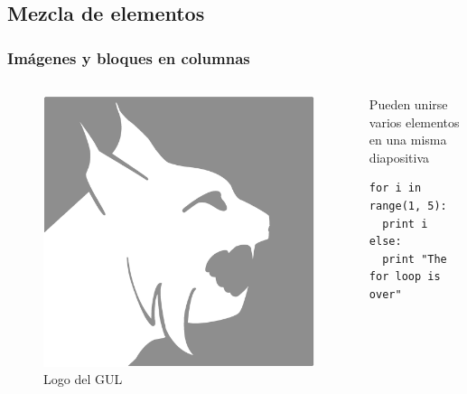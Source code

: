 \documentclass[aspectratio=43]{beamer}
\begin{document}
\subsection{Mezcla de elementos}

\begin{frame}[fragile]
    \frametitle{Imágenes y bloques en columnas}
    \begin{columns}
            \begin{figure}
                \includegraphics[scale=0.5]{img/logo1.png}
                \caption{Logo del GUL}
            \end{figure}
            \begin{block}{Pueden unirse varios elementos en una misma diapositiva} %
                \begin{verbatim}
for i in range(1, 5):
  print i
else:
  print "The for loop is over"
                \end{verbatim}
            \end{block}
    \end{columns}
\end{frame}
\end{document}
